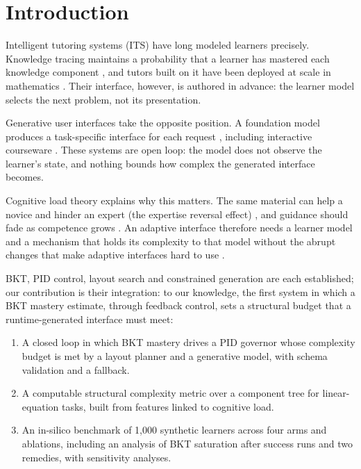 \documentclass[conference]{IEEEtran}
\begin{document}
\section{Introduction}

Intelligent tutoring systems (ITS) have long modeled learners precisely.
Knowledge tracing maintains a probability that a learner has mastered each
knowledge component \cite{corbett1995knowledge}, and
tutors built on it have been deployed at scale in mathematics
\cite{ritter2007cognitive,vanlehn2011relative}. Their interface,
however, is authored in advance: the learner model selects the next problem,
not its presentation.

Generative user interfaces take the opposite position. A foundation model
produces a task-specific interface for each request
\cite{leviathan2026genui}, including interactive courseware
\cite{tu2026maicui}. These systems are open loop: the model does not observe
the learner's state, and nothing bounds how complex the generated interface
becomes.

Cognitive load theory explains why this matters. The same material can help
a novice and hinder an expert (the expertise reversal effect)
\cite{kalyuga2003expertise}, and guidance should fade as
competence grows \cite{renkl2003structuring,salden2010expertise}. An
adaptive interface therefore needs a learner model and a mechanism that holds
its complexity to that model without the abrupt changes that make adaptive
interfaces hard to use \cite{gajos2008predictability,findlater2004menus}.

BKT, PID control, layout search and constrained generation are each
established; our contribution is their integration: to our knowledge, the first
system in which a BKT mastery estimate, through feedback control, sets a
structural budget that a runtime-generated interface must meet:
\begin{enumerate}
\item A closed loop in which BKT mastery drives a PID governor whose
complexity budget is met by a layout planner and a generative model, with
schema validation and a fallback.
\item A computable structural complexity metric over a component tree for
linear-equation tasks, built from features linked to cognitive load.
\item An in-silico benchmark of 1,000 synthetic learners across four arms
and ablations, including an analysis of BKT saturation after success runs
and two remedies, with sensitivity analyses.
\end{enumerate}
\end{document}
